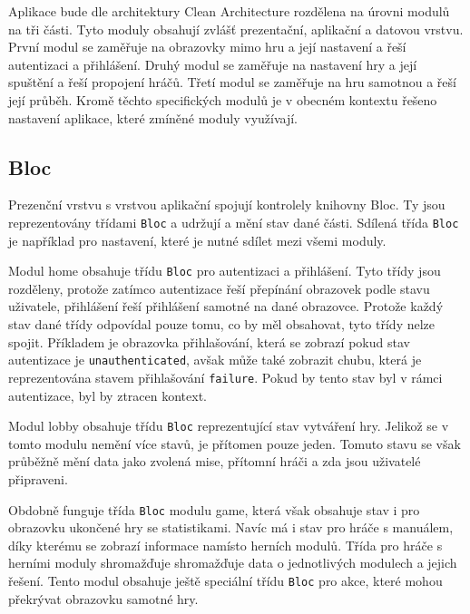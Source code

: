 Aplikace bude dle architektury Clean Architecture rozdělena
na úrovni modulů na tři části.
Tyto moduly obsahují zvlášť prezentační, aplikační a datovou vrstvu.
První modul se zaměřuje na obrazovky mimo hru a její nastavení
a řeší autentizaci a přihlášení.
Druhý modul se zaměřuje na nastavení hry a její spuštění a řeší propojení hráčů.
Třetí modul se zaměřuje na hru samotnou a řeší její průběh.
Kromě těchto specifických modulů je v obecném kontextu řešeno nastavení
aplikace,
které zmíněné moduly využívají.

\subsection{Bloc}

Prezenční vrstvu s vrstvou aplikační spojují kontrolely knihovny Bloc.
Ty jsou reprezentovány třídami \texttt{Bloc} a udržují a mění stav
dané části.
Sdílená třída \texttt{Bloc} je například pro nastavení,
které je nutné sdílet mezi všemi moduly.

Modul home obsahuje třídu \texttt{Bloc} pro autentizaci a přihlášení.
Tyto třídy jsou rozděleny,
protože zatímco autentizace řeší přepínání obrazovek podle stavu uživatele,
přihlášení řeší přihlášení samotné na dané obrazovce.
Protože každý stav dané třídy odpovídal pouze tomu,
co by měl obsahovat,
tyto třídy nelze spojit.
Příkladem je obrazovka přihlašování,
která se zobrazí pokud stav autentizace je \texttt{unauthenticated},
avšak může také zobrazit chubu,
která je reprezentována stavem přihlašování \texttt{failure}.
Pokud by tento stav byl v rámci autentizace,
byl by ztracen kontext.

Modul lobby obsahuje třídu \texttt{Bloc} reprezentující stav
vytváření hry.
Jelikož se v tomto modulu nemění více stavů,
je přítomen pouze jeden.
Tomuto stavu se však průběžně mění data jako zvolená mise,
přítomní hráči a zda jsou uživatelé připraveni.

Obdobně funguje třída \texttt{Bloc} modulu game,
která však obsahuje stav i pro obrazovku ukončené hry se statistikami.
Navíc má i stav pro hráče s manuálem,
díky kterému se zobrazí informace namísto herních modulů.
Třída pro hráče s herními moduly shromažďuje shromažďuje data o jednotlivých
modulech a jejich řešení.
Tento modul obsahuje ještě speciální třídu \texttt{Bloc} pro akce,
které mohou překrývat obrazovku samotné hry.
